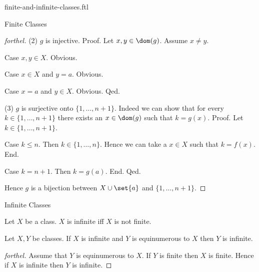 \documentclass{naproche-library}
\begin{document}
\begin{smodule}[title=Finite and Infinite Classes]{finite-and-infinite-classes.ftl}
\begin{sfragment}{Finite Classes}
\begin{proof}[forthel]
    (2) $g$ is injective. \newline
    Proof.
      Let $x, y \in \dom(g)$.
      Assume $x \neq y$.
      
      Case $x, y \in X$. Obvious.

      Case $x \in X$ and $y = a$. Obvious.

      Case $x = a$ and $y \in X$. Obvious.
    Qed.

    (3) $g$ is surjective onto $\{ 1, \dots, n + 1 \}$.
    Indeed we can show that for every $k \in \{1, \dots, n + 1 \}$ there exists an $x \in \dom(g)$ such that $k = g(x)$. \newline
    Proof.
      Let $k \in \{ 1, \dots, n + 1 \}$.

      Case $k \leq n$.
        Then $k \in \{ 1, \dots, n \}$.
        Hence we can take a $x \in X$ such that $k = f(x)$.
      End.

      Case $k = n + 1$.
        Then $k = g(a)$.
      End.
    Qed.

    Hence $g$ is a bijection between $X \cup \set{a}$ and $\{ 1, \dots, n + 1 \}$.
  \end{proof}
\end{sfragment}

\begin{sfragment}{Infinite Classes}
  \begin{definition}[forthel,id=FOUNDATIONS_14_6612510618681344]
    Let $X$ be a class.
    $X$ is infinite iff $X$ is not finite.
  \end{definition}

  \begin{proposition}[forthel,id=FOUNDATIONS_14_5814530911240192]
    Let $X, Y$ be classes.
    If $X$ is infinite and $Y$ is equinumerous to $X$ then $Y$ is infinite.
  \end{proposition}
  \begin{proof}[forthel]
    Assume that $Y$ is equinumerous to $X$.
    If $Y$ is finite then $X$ is finite.
    Hence if $X$ is infinite then $Y$ is infinite.
  \end{proof}
\end{sfragment}
\end{smodule}
\end{document}
